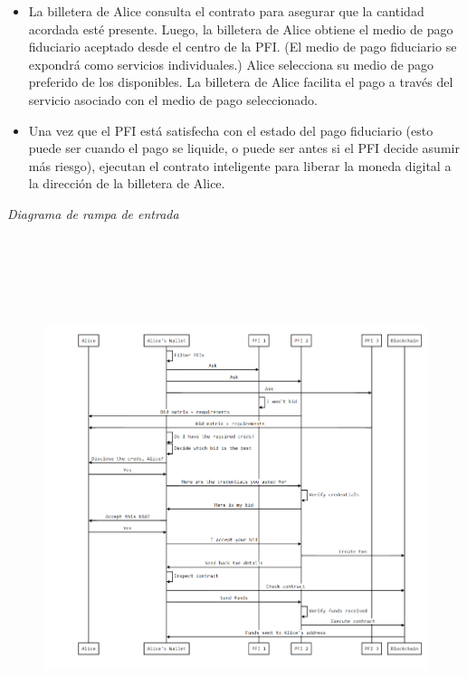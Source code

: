 \documentclass[11pt]{article}
\begin{document}
\begin{itemize}
	\item La billetera de Alice consulta el contrato para asegurar que la cantidad acordada esté presente. Luego, la billetera de Alice obtiene el medio de pago fiduciario aceptado desde el centro de la PFI. (El medio de pago fiduciario se expondrá como servicios individuales.) Alice selecciona su medio de pago preferido de los disponibles. La billetera de Alice facilita el pago a través del servicio asociado con el medio de pago seleccionado.

	\item Una vez que el PFI está satisfecha con el estado del pago fiduciario (esto puede ser cuando el pago se liquide, o puede ser antes si el PFI decide asumir más riesgo), ejecutan el contrato inteligente para liberar la moneda digital a la dirección de la billetera de Alice.

\vspace{1\baselineskip}
\end{itemize}
\begin{center}
\textit{Diagrama de rampa de entrada}
\end{center}



\vspace{1\baselineskip}
\begin{figure}[H]
\centering
\includegraphics[width=16.4cm,height=15.3cm]{./diagrams/on-ramp.png}
\end{figure}
\end{document}
